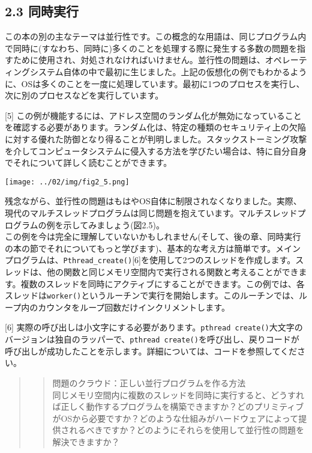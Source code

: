 \hypertarget{ux540cux6642ux5b9fux884c}{%
\subsection*{2.3 同時実行}\label{ux540cux6642ux5b9fux884c}}

この本の別の主なテーマは並行性です。この概念的な用語は、同じプログラム内で同時に(すなわち、同時に)多くのことを処理する際に発生する多数の問題を指すために使用され、対処されなければいけません。並行性の問題は、オペレーティングシステム自体の中で最初に生じました。上記の仮想化の例でもわかるように、OSは多くのことを一度に処理しています。最初に1つのプロセスを実行し、次に別のプロセスなどを実行しています。

{[}5{]}
この例が機能するには、アドレス空間のランダム化が無効になっていることを確認する必要があります。ランダム化は、特定の種類のセキュリティ上の欠陥に対する優れた防御となり得ることが判明しました。スタックストーミング攻撃を介してコンピュータシステムに侵入する方法を学びたい場合は、特に自分自身でそれについて詳しく読むことができます。

\texttt{[image: ../02/img/fig2\_5.png]}

残念ながら、並行性の問題はもはやOS自体に制限されなくなりました。実際、現代のマルチスレッドプログラムは同じ問題を抱えています。マルチスレッドプログラムの例を示してみましょう(図2.5)。\\
この例を今は完全に理解していないかもしれません(そして、後の章、同時実行の本の節でそれについてもっと学びます)、基本的な考え方は簡単です。メインプログラムは、\texttt{Pthread\_create()}{[}6{]}を使用して2つのスレッドを作成します。スレッドは、他の関数と同じメモリ空間内で実行される関数と考えることができます。複数のスレッドを同時にアクティブにすることができます。この例では、各スレッドは\texttt{worker()}というルーチンで実行を開始します。このルーチンでは、ループ内のカウンタをループ回数だけインクリメントします。

{[}6{]}
実際の呼び出しは小文字にする必要があります。\texttt{pthread\ create()}大文字のバージョンは独自のラッパーで、\texttt{pthread\ create()}を呼び出し、戻りコードが呼び出しが成功したことを示します。詳細については、コードを参照してください。

\begin{quote}
\begin{quote}
問題のクラウド：正しい並行プログラムを作る方法\\
同じメモリ空間内に複数のスレッドを同時に実行すると、どうすれば正しく動作するプログラムを構築できますか？どのプリミティブがOSから必要ですか？どのような仕組みがハードウェアによって提供されるべきですか？どのようにそれらを使用して並行性の問題を解決できますか？
\end{quote}
\end{quote}

